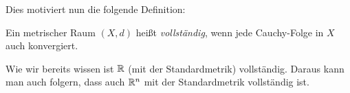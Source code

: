 \documentclass[a4paper,10pt]{article}
\begin{document}
Dies motiviert nun die folgende Definition:


\begin{defi}
 Ein metrischer Raum $(X,d)$ heißt \emph{vollständig}, wenn jede Cauchy-Folge in $X$ auch konvergiert.
\end{defi}

\begin{bsp}
 Wie wir bereits wissen ist $\mathbb{R}$ (mit der Standardmetrik) vollständig. Daraus kann man auch folgern, dass auch $\mathbb{R}^n$ mit der Standardmetrik vollständig ist.
\end{bsp}
\end{document}
